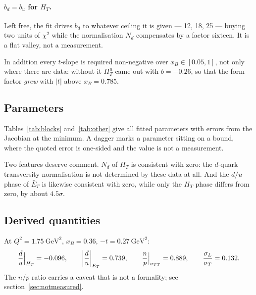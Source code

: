 \documentclass[11pt,a4paper]{article}
\newcommand{\sig}[1]{\sigma_{#1}}
\begin{document}
\paragraph{$b_d = b_u$ for $H_T$.}  Left free, the fit drives $b_d$ to whatever
ceiling it is given --- 12, 18, 25 --- buying two units of $\chi^2$ while the
normalisation $N_d$ compensates by a factor sixteen.  It is a flat valley, not
a measurement.

In addition every $t$-slope is required non-negative over $x_B \in [0.05,1]$,
not only where there are data: without it $H_T^u$ came out with $b=-0.26$, so
that the form factor \emph{grew} with $|t|$ above $x_B = 0.785$.

\subsection{Parameters}

Tables~\ref{tab:blocks} and~\ref{tab:other} give all \npar{} fitted
parameters with errors from the Jacobian at the minimum.  A dagger marks a
parameter sitting on a bound, where the quoted error is one-sided and the value
is not a measurement.

\begin{table}[htb]
\centering\small
\caption{Block parameters, eq.~(\ref{eq:mod}).  Every block is a
\emph{convolution} $\langle X\rangle$, not a GPD: no GPD is fitted anywhere in
this work.  $N$ in nb$^{1/2}$/GeV, $b$ and $b'$ in GeV$^{-2}$, $n_Q$
dimensionless.}
\label{tab:blocks}

\end{table}

\begin{table}[htb]
\centering\small
\caption{Remaining parameters, with the interval each was allowed.}
\label{tab:other}

\end{table}

Two features deserve comment.  $N_d$ of $H_T$ is consistent with zero: the
$d$-quark transversity normalisation is not determined by these data at all.
And the $d/u$ phase of $\bar E_T$ is likewise consistent with zero, while only
the $H_T$ phase differs from zero, by about $4.5\sigma$.

\subsection{Derived quantities}

At $Q^2 = 1.75\ \mathrm{GeV}^2$, $x_B = 0.36$, $-t = 0.27\ \mathrm{GeV}^2$:
\[
\frac{d}{u}\Big|_{H_T} = \rduHT, \qquad
\left|\frac{d}{u}\right|_{\bar E_T} = \rduET, \qquad
\frac{n}{p}\Big|_{\sig{TT}} = \rnoverp, \qquad
\frac{\sig{L}}{\sig{T}} = \rsigLoversigT .
\]
The $n/p$ ratio carries a caveat that is not a formality; see
section~\ref{sec:notmeasured}.
\end{document}
